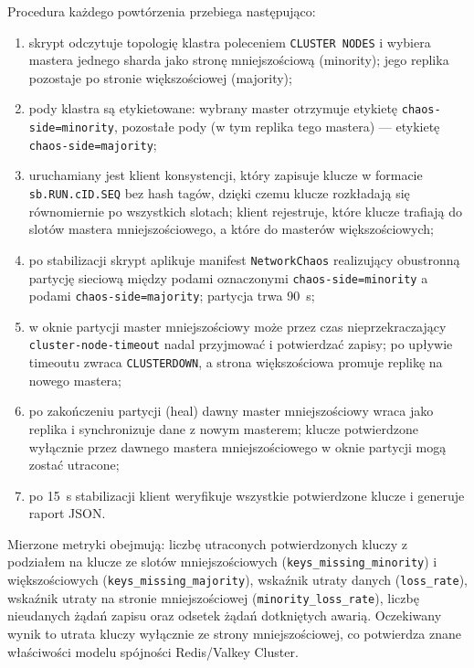 Procedura każdego powtórzenia przebiega następująco:

\begin{enumerate}
    \item skrypt odczytuje topologię klastra poleceniem \texttt{CLUSTER NODES} i wybiera mastera jednego sharda jako stronę mniejszościową (minority); jego replika pozostaje po stronie większościowej (majority);
    \item pody klastra są etykietowane: wybrany master otrzymuje etykietę \texttt{chaos-side=minority}, pozostałe pody (w tym replika tego mastera) --- etykietę \texttt{chaos-side=majority};
    \item uruchamiany jest klient konsystencji, który zapisuje klucze w formacie \texttt{sb.RUN.cID.SEQ} bez hash tagów, dzięki czemu klucze rozkładają się równomiernie po wszystkich slotach; klient rejestruje, które klucze trafiają do slotów mastera mniejszościowego, a które do masterów większościowych;
    \item po stabilizacji skrypt aplikuje manifest \texttt{NetworkChaos} realizujący obustronną partycję sieciową między podami oznaczonymi \texttt{chaos-side=minority} a podami \texttt{chaos-side=majority}; partycja trwa 90~s;
    \item w oknie partycji master mniejszościowy może przez czas nieprzekraczający \texttt{cluster-node-timeout} nadal przyjmować i potwierdzać zapisy; po upływie timeoutu zwraca \texttt{CLUSTERDOWN}, a strona większościowa promuje replikę na nowego mastera;
    \item po zakończeniu partycji (heal) dawny master mniejszościowy wraca jako replika i synchronizuje dane z nowym masterem; klucze potwierdzone wyłącznie przez dawnego mastera mniejszościowego w oknie partycji mogą zostać utracone;
    \item po 15~s stabilizacji klient weryfikuje wszystkie potwierdzone klucze i generuje raport JSON.
\end{enumerate}

Mierzone metryki obejmują: liczbę utraconych potwierdzonych kluczy z podziałem na klucze ze slotów mniejszościowych (\texttt{keys\_missing\_minority}) i większościowych (\texttt{keys\_missing\_majority}), wskaźnik utraty danych (\texttt{loss\_rate}), wskaźnik utraty na stronie mniejszościowej (\texttt{minority\_loss\_rate}), liczbę nieudanych żądań zapisu oraz odsetek żądań dotkniętych awarią. Oczekiwany wynik to utrata kluczy wyłącznie ze strony mniejszościowej, co potwierdza znane właściwości modelu spójności Redis/Valkey Cluster.

